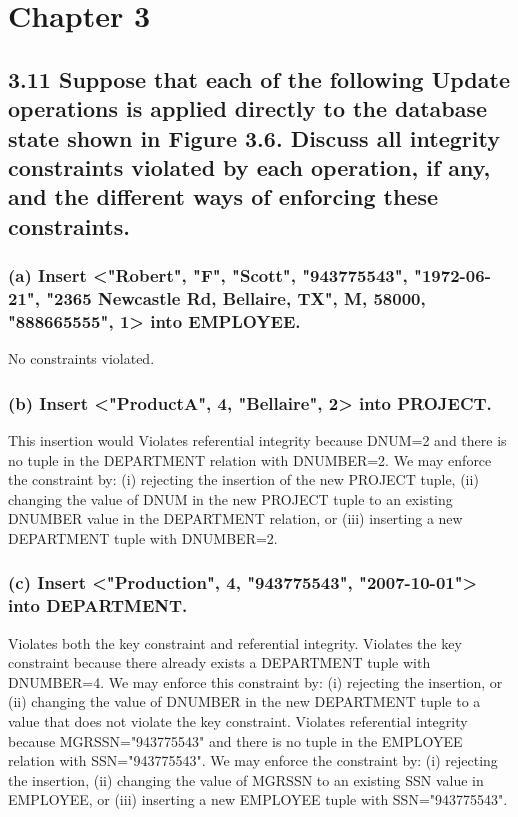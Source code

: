 \section*{Chapter 3}
\subsection*{3.11 Suppose that each of the following Update operations is applied directly to the database state shown in Figure 3.6. Discuss all integrity constraints violated by each operation, if any, and the different ways of enforcing these constraints.}
\subsubsection*{(a) Insert <"Robert", "F", "Scott", "943775543", "1972-06-21", "2365 Newcastle Rd, Bellaire, TX", M, 58000, "888665555", 1> into EMPLOYEE.}
No constraints violated.

\subsubsection*{(b) Insert <"ProductA", 4, "Bellaire", 2> into PROJECT.}
This insertion would Violates referential integrity because DNUM=2 and there is no tuple in the DEPARTMENT relation with DNUMBER=2. We may enforce the constraint by: (i) rejecting the insertion of the new PROJECT tuple, (ii) changing the value of DNUM in the new PROJECT tuple to an existing DNUMBER value in the DEPARTMENT relation, or (iii) inserting a new DEPARTMENT tuple with DNUMBER=2.

\subsubsection*{(c) Insert <"Production", 4, "943775543", "2007-10-01"> into DEPARTMENT.}
Violates both the key constraint and referential integrity. Violates the key constraint because there already exists a DEPARTMENT tuple with DNUMBER=4. We may enforce this constraint by: (i) rejecting the insertion, or (ii) changing the value of DNUMBER
in the new DEPARTMENT tuple to a value that does not violate the key constraint. Violates referential integrity because MGRSSN="943775543" and there is no tuple in the EMPLOYEE relation with SSN="943775543". We may enforce the constraint by: (i) rejecting the insertion, (ii) changing the value of MGRSSN to an existing SSN value in EMPLOYEE, or (iii) inserting a new EMPLOYEE tuple with SSN="943775543".

